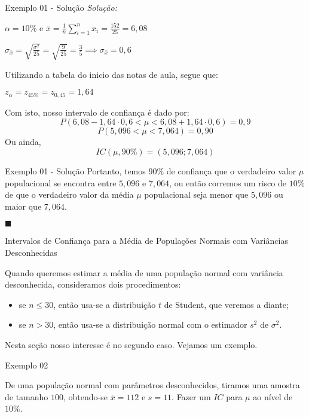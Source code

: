 \documentclass[hyperref={pdfpagelabels=false}]{beamer}
\begin{document}
\begin{frame}{Exemplo 01 - Solução}
	\textit{Solução: }
	
	$\alpha = 10\%$ e $\bar{x} = \displaystyle \frac{1}{n}\sum_{i = 1}^{n}x_i = \frac{152}{25} = 6,08$
	
	\pause
	$\sigma_{\bar{x}} = \displaystyle \sqrt{\frac{\sigma^2}{25}} = \sqrt{\frac{9}{25}} = \frac{3}{5} \implies \sigma_{\bar{x}} = 0,6$
	
	\pause
	Utilizando a tabela do inicio das notas de aula, segue que:
	
	\pause
	$z_\alpha = z_{45\%} = z_{0,45} = 1,64$
	
	\pause
	Com isto, nosso intervalo de confiança é dado por:
	$$P(6,08 - 1,64 \cdot 0,6 < \mu < 6,08 + 1,64 \cdot 0,6) = 0,9$$
	$$P(5,096 < \mu < 7,064) = 0,90$$
	\pause
	Ou ainda,
	$$IC(\mu,90\%) = (5,096; 7,064)$$
	
\end{frame}


\begin{frame}{Exemplo 01 - Solução}
	Portanto, temos $90\%$ de confiança que o verdadeiro valor  $\mu$ populacional se encontra entre $5,096$ e $7,064$, ou então corremos um risco de $10\%$ de que o verdadeiro valor da média $\mu$ populacional seja menor que $5,096$ ou maior que $7,064$.

\begin{flushright}
	$\blacksquare$
\end{flushright}
\end{frame}

\begin{frame}{Intervalos de Confiança para a Média de Populações Normais com Variâncias Desconhecidas}
	
	Quando queremos estimar a média de uma população normal com variância desconhecida, consideramos dois procedimentos:
	\pause
	\begin{itemize}
		\item se $n \leq 30$, então usa-se a distribuição $t$ de Student, que veremos a diante;\pause
		\item se $n > 30$, então usa-se a distribuição normal com o estimador $s^2$ de $\sigma^2$.
	\end{itemize}
	
	\pause
	Nesta seção nosso interesse é no segundo caso. Vejamos um exemplo.
	
\end{frame}


\begin{frame}{Exemplo 02}
	
	De uma população normal com parâmetros desconhecidos, tiramos uma amostra de tamanho $100$, obtendo-se $\bar{x} = 112$ e $s = 11$. Fazer um $IC$ para $\mu$ ao nível de $10\%$.
		
\end{frame}
\end{document}
